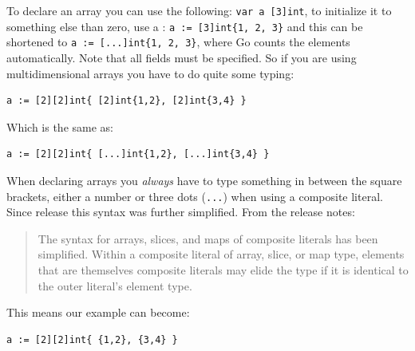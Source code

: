 To declare an array you can use the following: \lstinline{var a [3]int},
to initialize it to something else than zero, use a 
: \lstinline|a := [3]int{1, 2, 3}| and
this can be shortened to \lstinline|a := [...]int{1, 2, 3}|, where Go counts
the elements automatically. 
Note that all fields must be specified.  So if you are using multidimensional
arrays you have to do quite some typing:
\begin{lstlisting}
a := [2][2]int{ [2]int{1,2}, [2]int{3,4} }
\end{lstlisting}
Which is the same as:
\begin{lstlisting}
a := [2][2]int{ [...]int{1,2}, [...]int{3,4} }
\end{lstlisting}
When declaring arrays you \emph{always} have to type something in
between the square brackets, either a number or three dots (\verb|...|)
when using a composite literal. 
Since release  this syntax was further simplified.
From the release notes:
\begin{quote}
The syntax for arrays, slices, and maps of composite literals has been
simplified. Within a composite literal of array, slice, or map type, elements
that are themselves composite literals may elide the type if it is identical to
the outer literal's element type. 
\end{quote}
This means our example can become:
\begin{lstlisting}
a := [2][2]int{ {1,2}, {3,4} }
\end{lstlisting}

